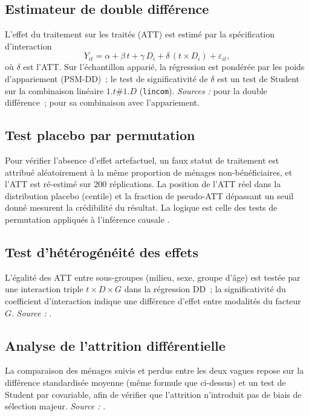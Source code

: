 \subsection{Estimateur de double différence}

L'effet du traitement sur les traités (ATT) est estimé par la spécification
d'interaction
\[
  Y_{it} = \alpha + \beta\, t + \gamma\, D_i + \delta\,(t \times D_i)
           + \varepsilon_{it},
\]
où $\delta$ est l'ATT. Sur l'échantillon apparié, la régression est pondérée
par les poids d'appariement (PSM-DD)~; le test de significativité de $\delta$
est un test de Student sur la combinaison linéaire $1.t\#1.D$
(\texttt{lincom}). \textit{Sources :} \textcite{card1994} pour la double
différence~; \textcite{heckman1997,heckman1998} pour sa combinaison avec
l'appariement.

\subsection{Test placebo par permutation}

Pour vérifier l'absence d'effet artefactuel, un faux statut de traitement est
attribué aléatoirement à la même proportion de ménages non-bénéficiaires,
et l'ATT est ré-estimé sur 200 réplications. La position de l'ATT réel dans
la distribution placebo (centile) et la fraction de pseudo-ATT dépassant un
seuil donné mesurent la crédibilité du résultat. La logique est celle des
tests de permutation appliqués à l'inférence causale
\parencite{heckman1997}.

\subsection{Test d'hétérogénéité des effets}

L'égalité des ATT entre sous-groupes (milieu, sexe, groupe d'âge) est testée
par une interaction triple $t \times D \times G$ dans la régression DD~; la
significativité du coefficient d'interaction indique une différence d'effet
entre modalités du facteur $G$. \textit{Source :} \textcite{card1994}.

\subsection{Analyse de l'attrition différentielle}

La comparaison des ménages suivis et perdus entre les deux vagues repose sur
la différence standardisée moyenne (même formule que ci-dessus) et un test de
Student par covariable, afin de vérifier que l'attrition n'introduit pas de
biais de sélection majeur. \textit{Source :} \textcite{rosenbaum2002}.
